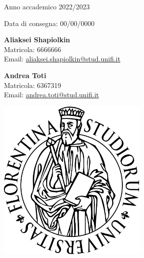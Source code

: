 \documentclass{article}
\begin{document}
\begin{titlepage}
    \begin{center}
        \vspace*{1cm}
        
        
        \vspace{0.5cm}
     {\Large {}}
        
        \vspace{0.5cm}
    
      \large Anno accademico 2022/2023
    \vspace{0.5cm}
    
    Data di consegna: 00/00/0000
    
    \vspace{0.5cm}
    \large{\textbf{Aliaksei Shapiolkin} \\Matricola: 6666666\\Email: \href{          
         mailto: aliaksei.shapiolkin@stud.unifi.it}{aliaksei.shapiolkin@stud.unifi.it}
    
    \textbf{Andrea Toti}\\Matricola: 6367319\\Email: \href{mailto:andrea.toti@stud.unifi.it}{andrea.toti@stud.unifi.it} 
    }
      \vspace{0.2cm}
      \vspace{0.7cm}
        \includegraphics[width=0.55\textwidth]{logo.png} 
    \end{center}
    \end{titlepage}
    
\tableofcontents
\end{document}

